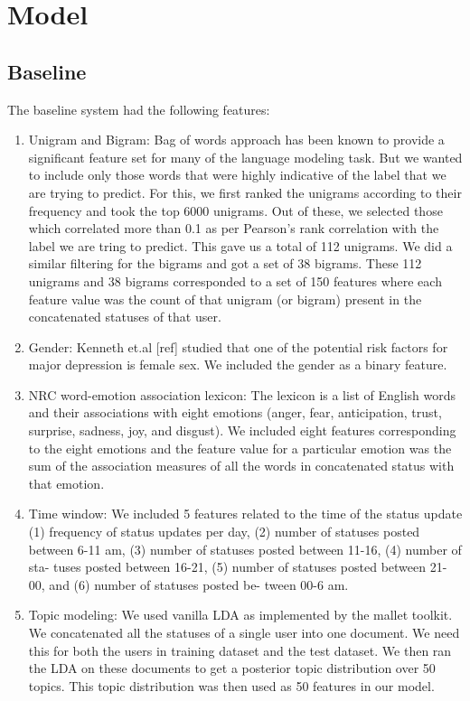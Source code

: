 \section{Model}
\subsection{Baseline}
The  baseline system had the following features:
\begin{enumerate}
  \item Unigram and Bigram: Bag of words approach has been known to provide a significant feature set for many of the language modeling task. But we wanted to include only those words that were highly indicative of the label that we are trying to predict. For this, we first ranked the unigrams according to their frequency and took the top 6000 unigrams. Out of these, we selected those which correlated more than 0.1 as per Pearson's rank correlation with the label we are tring to predict. This gave us a total of 112 unigrams. We did a similar filtering for the bigrams and got a set of 38 bigrams. These 112 unigrams and 38 bigrams corresponded to a set of 150 features where each feature value was the count of that unigram (or bigram) present in the concatenated statuses of that user.
  \item Gender: Kenneth et.al [ref] studied that one of the potential risk factors for major depression is female sex. We included the gender as a binary feature.
  \item NRC word-emotion association lexicon: The lexicon is a list of English words and their associations with eight emotions (anger, fear, anticipation, trust, surprise, sadness, joy, and disgust). We included eight features corresponding to the eight emotions and the feature value for a particular emotion was the sum of the association measures of all the words in concatenated status with that emotion.
  \item Time window:  We included 5 features  related to the time of the status update (1) frequency of status updates per day, (2) number of statuses posted between 6-11 am, (3) number of statuses posted between 11-16, (4) number of sta- tuses posted between 16-21, (5) number of statuses posted between 21-00, and (6) number of statuses posted be- tween 00-6 am.
  \item Topic modeling: We used vanilla LDA as implemented by the mallet toolkit. We concatenated all the statuses of a single user into one document. We need this for both the users in training dataset and the test dataset. We then ran the LDA on these documents to get a posterior topic distribution over 50 topics. This topic distribution was then used as 50 features in our model.
\end{enumerate}
